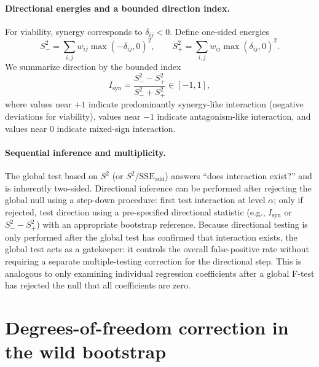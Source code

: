 \documentclass[pdflatex,sn-nature]{sn-jnl}%
\begin{document}
\paragraph{Directional energies and a bounded direction index.}
For viability, synergy corresponds to $\delta_{ij}<0$.
Define one-sided energies
\begin{equation}
S^2_{-}=\sum_{i,j} w_{ij}\max(-\delta_{ij},0)^2,\qquad
S^2_{+}=\sum_{i,j} w_{ij}\max(\delta_{ij},0)^2.
\end{equation}
We summarize direction by the bounded index
\begin{equation}
I_{\mathrm{syn}}=\frac{S^2_{-}-S^2_{+}}{S^2_{-}+S^2_{+}}\in[-1,1],
\end{equation}
where values near $+1$ indicate predominantly synergy-like interaction (negative deviations for viability), values near $-1$ indicate antagonism-like interaction, and values near $0$ indicate mixed-sign interaction.

\paragraph{Sequential inference and multiplicity.}
The global test based on $S^2$ (or $S^2/\mathrm{SSE}_{\mathrm{add}}$) answers ``does interaction exist?'' and is inherently two-sided.
Directional inference can be performed after rejecting the global null using a step-down procedure: first test interaction at level $\alpha$; only if rejected, test direction using a pre-specified directional statistic (e.g., $I_{\mathrm{syn}}$ or $S^2_{-}-S^2_{+}$) with an appropriate bootstrap reference.
Because directional testing is only performed after the global test has confirmed that interaction exists, the global test acts as a gatekeeper: it controls the overall false-positive rate without requiring a separate multiple-testing correction for the directional step.
This is analogous to only examining individual regression coefficients after a global F-test has rejected the null that all coefficients are zero.

\section{Degrees-of-freedom correction in the wild bootstrap}
\end{document}
